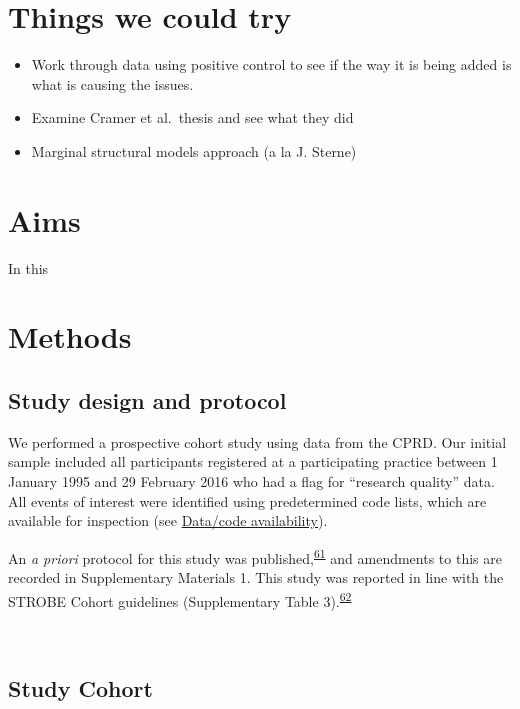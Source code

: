 \documentclass[a4paper, twoside]{templates/ociamthesis}
\providecommand{\tightlist}{%
  \setlength{\itemsep}{0pt}\setlength{\parskip}{0pt}}
\begin{document}
\hypertarget{things-we-could-try}{%
\section{Things we could try}\label{things-we-could-try}}

\begin{itemize}
\tightlist
\item
  Work through data using positive control to see if the way it is being added is what is causing the issues.
\item
  Examine Cramer et al.~thesis and see what they did
\item
  Marginal structural models approach (a la J. Sterne)
\end{itemize}

\hypertarget{aims-1}{%
\section{Aims}\label{aims-1}}

In this

\hypertarget{methods-1}{%
\section{Methods}\label{methods-1}}

\hypertarget{study-design-and-protocol}{%
\subsection{Study design and protocol}\label{study-design-and-protocol}}

We performed a prospective cohort study using data from the CPRD. Our initial sample included all participants registered at a participating practice between 1 January 1995 and 29 February 2016 who had a flag for ``research quality'' data. All events of interest were identified using predetermined code lists, which are available for inspection (see \protect\hyperlink{data-code-avail}{Data/code availability}).

An \emph{a priori} protocol for this study was published,\textsuperscript{\protect\hyperlink{ref-walker2016a}{61}} and amendments to this are recorded in Supplementary Materials 1. This study was reported in line with the STROBE Cohort guidelines (Supplementary Table 3).\textsuperscript{\protect\hyperlink{ref-vonelm2008}{62}}

~

\hypertarget{study-cohort}{%
\subsection{Study Cohort}\label{study-cohort}}
\end{document}
